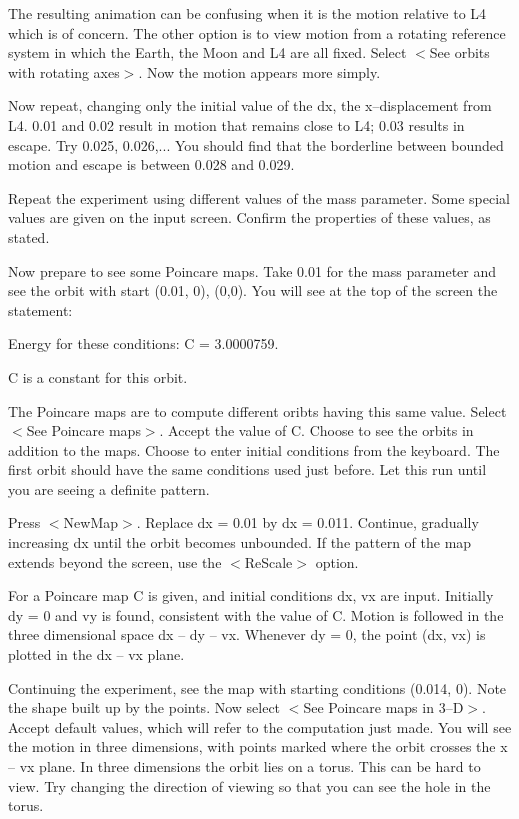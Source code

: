    The resulting animation can be confusing when it is the motion
relative to L4 which is of concern. The other option is to view motion
from a rotating reference system in which the Earth, the Moon and L4
are all fixed. Select $<$See orbits with rotating axes$>$. Now the motion
appears more simply.

   Now repeat, changing only the initial value of the dx, the
x--displacement from L4. 0.01 and 0.02 result in motion that remains close
to L4; 0.03 results in escape. Try 0.025, 0.026,... You should find that
the borderline between bounded motion and escape is between 0.028 and 0.029.

   Repeat the experiment using different values of the mass parameter.
Some special values are given on the input screen. Confirm the
properties of these values, as stated.

   Now prepare to see some Poincare maps. Take 0.01 for the mass
parameter and see the orbit with start (0.01, 0), (0,0). You will see at
the top of the screen the statement:

    Energy for these conditions: C = 3.0000759.

C is a constant for this orbit.

   The Poincare maps are to compute different oribts having this same
value. Select $<$See Poincare maps$>$. Accept the value of C. Choose to see
the orbits in addition to the maps. Choose to enter initial conditions
from the keyboard. The first orbit should have the same conditions used
just before. Let this run until you are seeing a definite pattern.

   Press $<$NewMap$>$. Replace dx = 0.01 by dx = 0.011. Continue, gradually
increasing dx until the orbit becomes unbounded. If the pattern of the
map extends beyond the screen, use the $<$ReScale$>$ option.

   For a Poincare map C is given, and initial conditions dx, vx are
input. Initially dy = 0 and vy is found, consistent with the value of
C. Motion is followed in the three dimensional space dx -- dy -- vx.
Whenever dy = 0, the point (dx, vx) is plotted in the dx -- vx plane.

   Continuing the experiment, see the map with starting conditions
(0.014, 0). Note the shape built up by the points. Now select $<$See
Poincare maps in 3--D$>$. Accept default values, which will refer to
the computation just made. You will see the motion in three
dimensions, with points marked where the orbit crosses the x -- vx
plane. In three dimensions the orbit lies on a torus. This can be
hard to view. Try changing the direction of viewing so that you can
see the hole in the torus.



